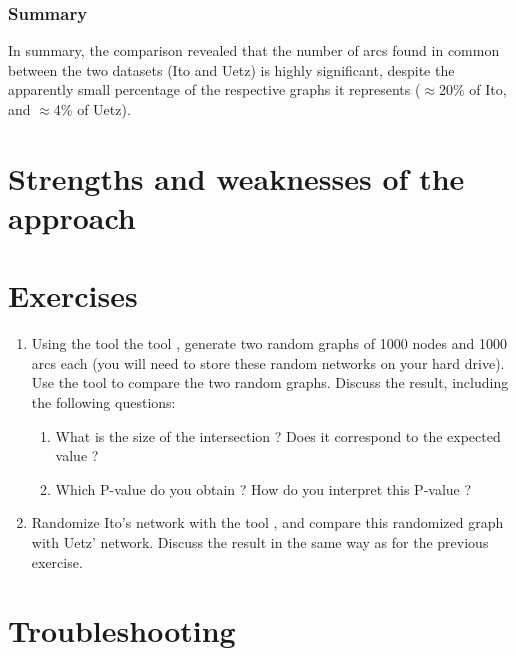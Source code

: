 \subsubsection{Summary}

In summary, the comparison revealed that the number of arcs found in
common between the two datasets (Ito and Uetz) is highly significant,
despite the apparently small percentage of the respective graphs it
represents ($\approx$20\% of Ito, and $\approx$4\% of Uetz).



\section{Strengths and weaknesses of the approach}

\section{Exercises}

\begin{enumerate}

\item Using the tool the tool ,
  generate two random graphs of 1000 nodes and 1000 arcs each (you
  will need to store these random networks on your hard drive).  Use
  the tool  to compare the two random
  graphs.
  Discuss the result, including the following questions: 
  \begin{enumerate}
  \item What is the size of the intersection ? Does it correspond to
    the expected value ? 
  \item Which P-value do you obtain ? How do you interpret this P-value ? 
  \end{enumerate}

\item Randomize Ito's network with the tool , and compare this randomized graph with Uetz'
  network. Discuss the result in the same way as for the previous
  exercise.

\end{enumerate}

\section{Troubleshooting}

